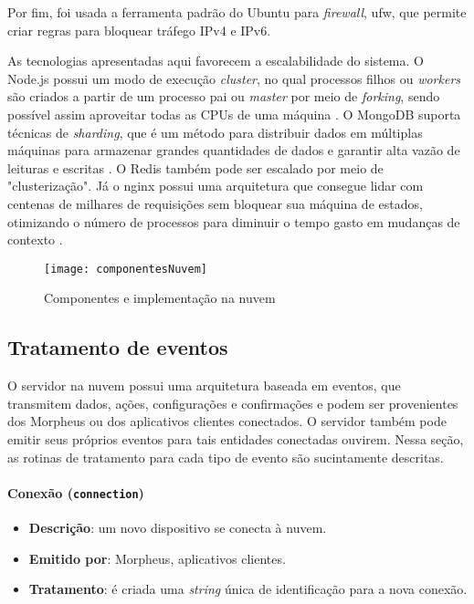 Por fim, foi usada a ferramenta padrão do Ubuntu para \emph{firewall}, ufw, que permite criar regras para bloquear tráfego IPv4 e IPv6.

As tecnologias apresentadas aqui favorecem a escalabilidade do sistema. O Node.js possui um modo de execução \emph{cluster}, no qual processos filhos ou \emph{workers} são criados a partir de um processo pai ou \emph{master} por meio de \emph{forking}, sendo possível assim aproveitar todas as CPUs de uma máquina \cite{nodejscluster}. O MongoDB suporta técnicas de \emph{sharding}, que é um método para distribuir dados em múltiplas máquinas para armazenar grandes quantidades de dados e garantir alta vazão de leituras e escritas \cite{mongodbsharding}. O Redis também pode ser escalado por meio de "clusterização". Já o nginx possui uma arquitetura que consegue lidar com centenas de milhares de requisições sem bloquear sua máquina de estados, otimizando o número de processos para diminuir o tempo gasto em mudanças de contexto \cite{nginxscalability}.

\begin{figure}[H]
	\centering
	\caption{Componentes e implementação na nuvem}
  \texttt{[image: componentesNuvem]}
\label{fig:componentesNuvem}
\end{figure}

\subsection{Tratamento de eventos}

O servidor na nuvem possui uma arquitetura baseada em eventos, que transmitem dados, ações, configurações e confirmações e podem ser provenientes dos Morpheus ou dos aplicativos clientes conectados. O servidor também pode emitir seus próprios eventos para tais entidades conectadas ouvirem. Nessa seção, as rotinas de tratamento para cada tipo de evento são sucintamente descritas.

\paragraph{Conexão (\texttt{connection})}
\begin{itemize}
\item \textbf{Descrição}: um novo dispositivo se conecta à nuvem.
\item \textbf{Emitido por}: Morpheus, aplicativos clientes.
\item \textbf{Tratamento}: é criada uma \emph{string} única de identificação para a nova conexão.
\end{itemize}

